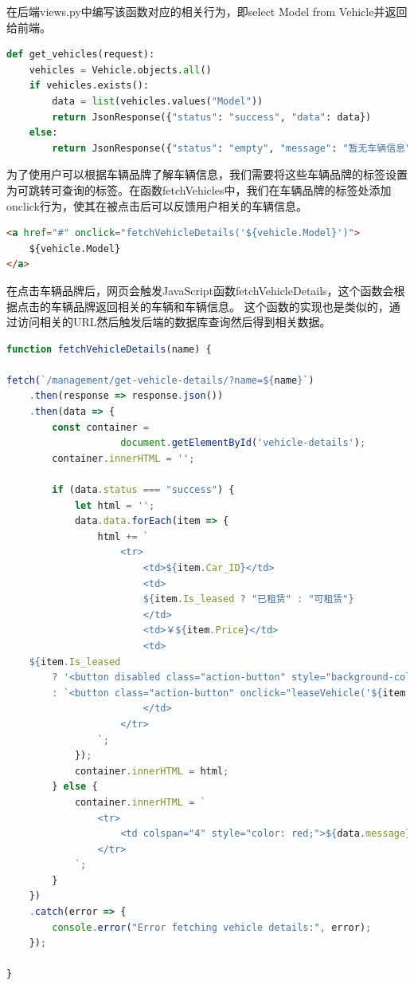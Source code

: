 \documentclass[UTF8,a4paper,12pt]{ctexart}
\begin{document}
在后端views.py中编写该函数对应的相关行为，即select Model from Vehicle并返回给前端。
\begin{lstlisting}[language=Python]
def get_vehicles(request):
    vehicles = Vehicle.objects.all()
    if vehicles.exists():
        data = list(vehicles.values("Model"))
        return JsonResponse({"status": "success", "data": data})
    else:
        return JsonResponse({"status": "empty", "message": "暂无车辆信息"})
\end{lstlisting}

为了使用户可以根据车辆品牌了解车辆信息，我们需要将这些车辆品牌的标签设置为可跳转可查询的标签。在函数fetchVehicles中，我们在车辆品牌的标签处添加onclick行为，使其在被点击后可以反馈用户相关的车辆信息。
\begin{lstlisting}[language=HTML]
<a href="#" onclick="fetchVehicleDetails('${vehicle.Model}')">
    ${vehicle.Model}
</a>
\end{lstlisting}

在点击车辆品牌后，网页会触发JavaScript函数fetchVehicleDetails，这个函数会根据点击的车辆品牌返回相关的车辆和车辆信息。
这个函数的实现也是类似的，通过访问相关的URL然后触发后端的数据库查询然后得到相关数据。
\begin{lstlisting}[language=JavaScript]
function fetchVehicleDetails(name) {

fetch(`/management/get-vehicle-details/?name=${name}`)
    .then(response => response.json())
    .then(data => {
        const container = 
                    document.getElementById('vehicle-details');
        container.innerHTML = ''; 

        if (data.status === "success") {
            let html = '';
            data.data.forEach(item => {
                html += `
                    <tr>
                        <td>${item.Car_ID}</td>
                        <td>
                        ${item.Is_leased ? "已租赁" : "可租赁"}
                        </td>
                        <td>￥${item.Price}</td>
                        <td>
    ${item.Is_leased
        ? '<button disabled class="action-button" style="background-color: gray; cursor: not-allowed;">已租赁</button>'
        : `<button class="action-button" onclick="leaseVehicle('${item.Car_ID}', '${name}')">租赁</button>`}
                        </td>
                    </tr>
                `;
            });
            container.innerHTML = html;
        } else {
            container.innerHTML = `
                <tr>
                    <td colspan="4" style="color: red;">${data.message}</td>
                </tr>
            `;
        }
    })
    .catch(error => {
        console.error("Error fetching vehicle details:", error);
    });

}
\end{lstlisting}
\end{document}
